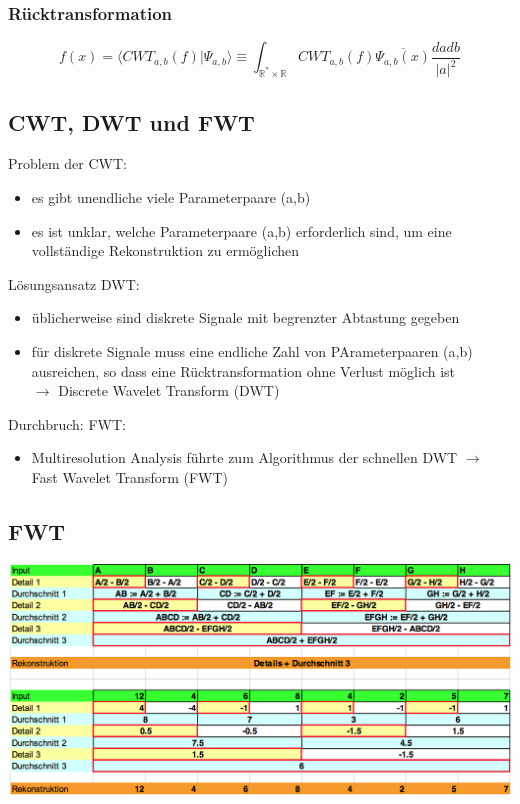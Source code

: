 \documentclass[10pt]{article}
\newcommand{\RN}{\mathbb{R}} %
\begin{document}
\subsubsection*{Rücktransformation}
 \begin{equation*}
	f(x)=\langle CWT_{a,b}(f) | \Psi_{a,b} \rangle \equiv \int_{\RN^*\times \RN} CWT_{a,b}(f) \overline{\Psi_{a,b}(x)} \frac{dadb}{|a|^2}
\end{equation*}

\subsection{CWT, DWT und FWT}
Problem der CWT:
\begin{itemize}
	\item es gibt unendliche viele Parameterpaare (a,b)
	\item es ist unklar, welche Parameterpaare (a,b) erforderlich sind, um eine vollständige Rekonstruktion zu ermöglichen
\end{itemize}
Lösungsansatz DWT:
\begin{itemize}
	\item üblicherweise sind diskrete Signale mit begrenzter Abtastung gegeben
	\item für diskrete Signale muss eine endliche Zahl von PArameterpaaren (a,b) ausreichen, so dass eine Rücktransformation ohne Verlust möglich ist \\
		$\rightarrow$ Discrete Wavelet Transform (DWT)
\end{itemize}
Durchbruch: FWT:
\begin{itemize}
	\item Multiresolution Analysis führte zum Algorithmus der schnellen DWT $\rightarrow$ Fast Wavelet Transform (FWT)
\end{itemize}

\subsection{FWT}
\begin{center}
	\includegraphics[scale=0.4]{fwt.png}
\end{center}
\end{document}
